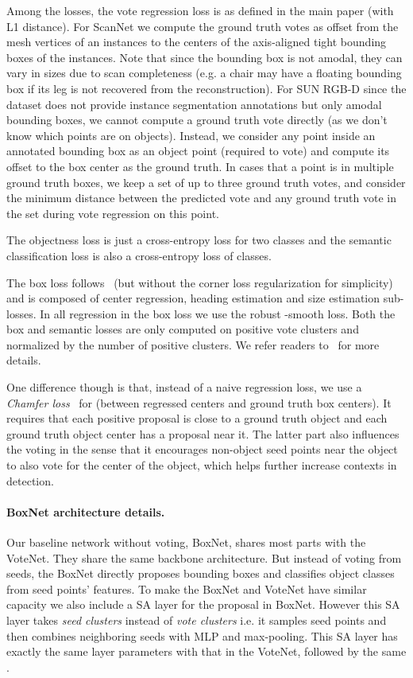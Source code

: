 \documentclass[10pt,twocolumn,letterpaper]{article}
\newcommand\votenet{VoteNet}
\begin{document}
Among the losses, the vote regression loss is as defined in the main paper (with L1 distance). For ScanNet we compute the ground truth votes as offset from the mesh vertices of an instances to the centers of the axis-aligned tight bounding boxes of the instances. Note that since the bounding box is not amodal, they can vary in sizes due to scan completeness (e.g. a chair may have a floating bounding box if its leg is not recovered from the reconstruction). For SUN RGB-D since the dataset does not provide instance segmentation annotations but only amodal bounding boxes, we cannot compute a ground truth vote directly (as we don't know which points are on objects). Instead, we consider any point inside an annotated bounding box as an object point (required to vote) and compute its offset to the box center as the ground truth. In cases that a point is in multiple ground truth boxes, we keep a set of up to three ground truth votes, and consider the minimum distance between the predicted vote and any ground truth vote in the set during vote regression on this point.

The objectness loss is just a cross-entropy loss for two classes and the semantic classification loss is also a cross-entropy loss of  classes.

The box loss follows~\cite{qi2018frustum} (but without the corner loss regularization for simplicity) and is composed of center regression, heading estimation and size estimation sub-losses. In all regression in the box loss we use the robust -smooth loss. Both the box and semantic losses are only computed on positive vote clusters and normalized by the number of positive clusters. We refer readers to~\cite{qi2018frustum} for more details.




One difference though is that, instead of a naive regression loss, we use a \emph{Chamfer loss}~\cite{fan2017point} for  (between regressed centers and ground truth box centers). It requires that each positive proposal is close to a ground truth object and each ground truth object center has a proposal near it. The latter part also influences the voting in the sense that it encourages non-object seed points near the object to also vote for the center of the object, which helps further increase contexts in detection.


\paragraph{BoxNet architecture details.}
Our baseline network without voting, BoxNet, shares most parts with the \votenet{}. They share the same backbone architecture. But instead of voting from seeds, the BoxNet directly proposes bounding boxes and classifies object classes from seed points' features. To make the BoxNet and \votenet{} have similar capacity we also include a SA layer for the proposal in BoxNet. However this SA layer takes \emph{seed clusters} instead of \emph{vote clusters} i.e. it samples seed points and then combines neighboring seeds with MLP and max-pooling. This SA layer has exactly the same layer parameters with that in the \votenet{}, followed by the same .
\end{document}
